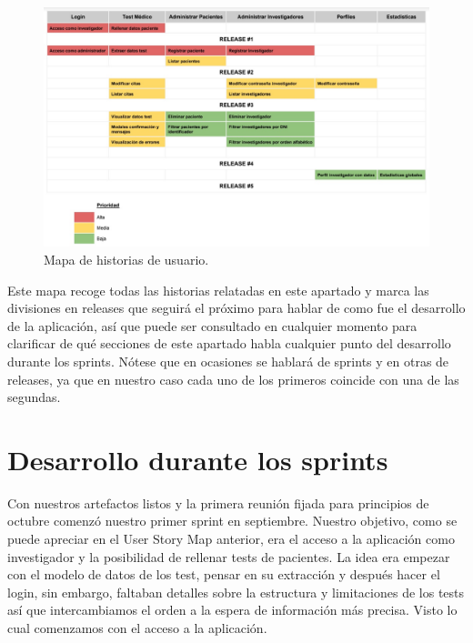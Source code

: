  \begin{figure}[h]
    \centering
     \includegraphics[width=1\textwidth]{images/userStoryMap.jpg}
    \caption{Mapa de historias de usuario.}
\end{figure}

Este mapa recoge todas las historias relatadas en este apartado y marca las divisiones en releases que seguirá el próximo para hablar de como fue el desarrollo de la aplicación, así que puede ser consultado en cualquier momento para clarificar de qué secciones de este apartado habla cualquier punto del desarrollo durante los sprints. Nótese que en ocasiones se hablará de sprints y en otras de releases, ya que en nuestro caso cada uno de los primeros coincide con una de las segundas.

\newpage

\section{Desarrollo durante los sprints}

Con nuestros artefactos listos y la primera reunión fijada para principios de octubre comenzó nuestro primer sprint en septiembre. Nuestro objetivo, como se puede apreciar en el User Story Map anterior, era el acceso a la aplicación como investigador y la posibilidad de rellenar tests de pacientes. La idea era empezar con el modelo de datos de los test, pensar en su extracción y después hacer el login, sin embargo, faltaban detalles sobre la estructura y limitaciones de los tests así que intercambiamos el orden a la espera de información más precisa. Visto lo cual comenzamos con el acceso a la aplicación.
\newline

